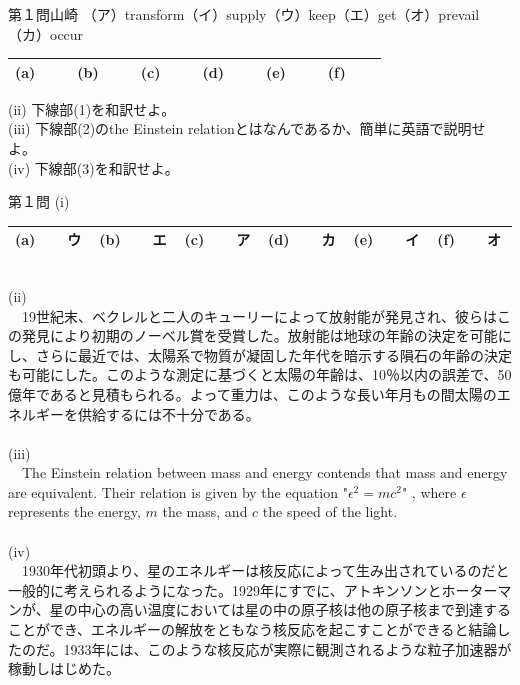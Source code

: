 \documentclass[fleqn]{jbook}
\begin{document}
\begin{question}{第１問}{山崎}
（ア）transform（イ）supply（ウ）keep（エ）get（オ）prevail（カ）occur

\begin{table}[htbp]
\begin{center}
\begin{tabular}{|c|c|c|c|c|c|c|c|c|c|c|c|}
\hline
(a) & 　 & (b) & 　 & (c) & 　 & (d) & 　 & (e) & 　 & (f) & 　 \\
\hline
\end{tabular}
\end{center}
\end{table}


(ii) 下線部(1)を和訳せよ。\\

(iii) 下線部(2)のthe Einstein relationとはなんであるか、簡単に英語で説明せよ。\\

(iv) 下線部(3)を和訳せよ。\\
\end{question}

\begin{answer}{第１問}{}
(i)
\begin{table}[h]
\begin{center}
\begin{tabular}{|c|c|c|c|c|c|c|c|c|c|c|c|}
\hline
(a) & 　ウ　 & (b) & 　エ　 & (c) & 　ア　 & (d) & 　カ　 & (e) & 　イ　 & (f) & 　オ　 \\
\hline
\end{tabular}
\end{center}
\end{table}
\\
(ii)\\
　19世紀末、ベクレルと二人のキューリーによって放射能が発見され、彼らはこの発見により初期のノーベル賞を受賞した。放射能は地球の年齢の決定を可能にし、さらに最近では、太陽系で物質が凝固した年代を暗示する隕石の年齢の決定も可能にした。このような測定に基づくと太陽の年齢は、10％以内の誤差で、50億年であると見積もられる。よって重力は、このような長い年月もの間太陽のエネルギーを供給するには不十分である。\\
\\
(iii)\\
　The Einstein relation between mass and energy contends that mass and energy are equivalent. Their relation is given by the equation "$\epsilon ^2 = mc^2$" , where $\epsilon $ represents the energy, $m$ the mass, and $c$ the speed of the light.\\
\\
(iv)\\
　1930年代初頭より、星のエネルギーは核反応によって生み出されているのだと一般的に考えられるようになった。1929年にすでに、アトキンソンとホーターマンが、星の中心の高い温度においては星の中の原子核は他の原子核まで到達することができ、エネルギーの解放をともなう核反応を起こすことができると結論したのだ。1933年には、このような核反応が実際に観測されるような粒子加速器が稼動しはじめた。\\


\end{answer}
\end{document}
